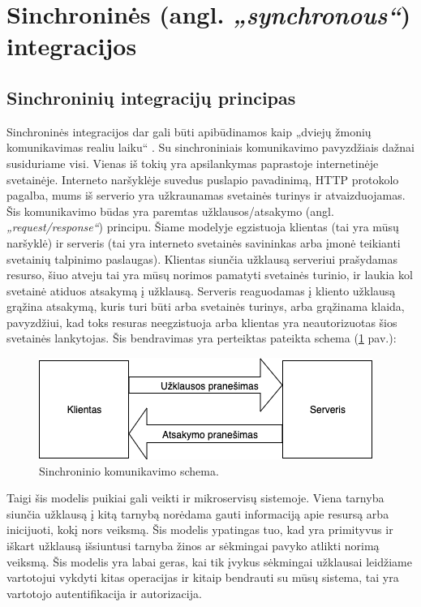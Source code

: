 \section{Sinchroninės (angl. \textit{„synchronous“}) integracijos}

\subsection{Sinchroninių integracijų principas}
Sinchroninės integracijos dar gali būti apibūdinamos kaip „dviejų žmonių komunikavimas realiu laiku“ \cite{Bk6}. Su sinchroniniais komunikavimo pavyzdžiais dažnai susiduriame visi. Vienas iš tokių yra apsilankymas paprastoje internetinėje svetainėje.
Interneto naršyklėje suvedus puslapio pavadinimą, HTTP protokolo pagalba, mums iš serverio yra užkraunamas svetainės turinys ir atvaizduojamas.
Šis komunikavimo būdas yra paremtas užklausos/atsakymo (angl. \textit{„request/response“}) principu. Šiame modelyje egzistuoja
klientas (tai yra mūsų naršyklė) ir serveris (tai yra interneto svetainės savininkas arba įmonė teikianti svetainių talpinimo paslaugas).
Klientas siunčia užklausą serveriui prašydamas resurso, šiuo atveju tai yra mūsų norimos pamatyti svetainės turinio, ir laukia kol svetainė atiduos atsakymą į užklausą.
Serveris reaguodamas į kliento užklausą grąžina atsakymą, kuris turi būti arba svetainės turinys, arba grąžinama klaida, pavyzdžiui, kad toks resuras neegzistuoja arba 
klientas yra neautorizuotas šios svetainės lankytojas. Šis bendravimas yra perteiktas pateikta schema (\ref{img:synchronous-model} pav.):

\begin{figure}[H]
  \centering
  \includegraphics[scale=0.6]{img/synchronous-model}
  \caption{Sinchroninio komunikavimo schema.}
  \label{img:synchronous-model}
\end{figure}

Taigi šis modelis puikiai gali veikti ir mikroservisų sistemoje. Viena tarnyba siunčia užklausą į kitą tarnybą norėdama gauti
informaciją apie resursą arba inicijuoti, kokį nors veiksmą. Šis modelis ypatingas tuo, kad yra primityvus ir iškart užklausą išsiuntusi tarnyba
žinos ar sėkmingai pavyko atlikti norimą veiksmą. Šis modelis yra labai geras, kai tik įvykus sėkmingai užklausai leidžiame vartotojui vykdyti
kitas operacijas ir kitaip bendrauti su mūsų sistema, tai yra vartotojo autentifikacija ir autorizacija.

